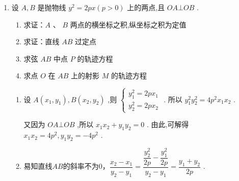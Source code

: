 \begin{enumerate}
\begin{jieda}
        设点 $P\left( {{x}_{1},{y}_{1}}\right) ,Q\left( {{x}_{2},{y}_{2}}\right)$，则 $\left\{  \begin{array}{l} {y}_{1}^{2} = 2{x}_{1}, \\  {y}_{2}^{2} = 2{x}_{2}, \end{array}\right.$
        
        两式相减可得$\left( {{y}_{1} - {y}_{2}}\right) \left( {{y}_{1} + {y}_{2}}\right)  = 2\left( {{x}_{1} - {x}_{2}}\right)$，故${k}_{PQ} = \dfrac{2}{{y}_{1} + {y}_{2}}$
        
        因为$P,Q$ 关于直线 $l$ 对称，所以${k}_{PQ} =  - 1$ ,即 ${y}_{1} + {y}_{2} =  - 2$，因此${PQ}$ 中点的纵坐标为 $\dfrac{{y}_{1} + {y}_{2}}{2} =  - 1$
        
        因为${PQ}$ 的中点在直线 $l$ 上，代入直线方程可得${PQ}$ 中点的横坐标为 $\dfrac{{x}_{1} + {x}_{2}}{2} = \left( {-1}\right)  + 2 = 1$ .
        
        故线段 ${PQ}$ 的中点坐标为(1, - 1).
    \end{jieda}
    \item 设 $A,B$ 是抛物线 ${y}^{2} = {2px}\left( {p > 0}\right)$ 上的两点,且 ${OA} \bot  {OB}$ .
    \begin{enumerate}
        \item 求证：$A$ 、 $B$ 两点的横坐标之积,纵坐标之积为定值
        \item 求证：直线 ${AB}$ 过定点
        \item 求弦 ${AB}$ 中点 $P$ 的轨迹方程
        \item 求点 $O$ 在 ${AB}$ 上的射影 $M$ 的轨迹方程
    \end{enumerate}
    \begin{jieda}
        \begin{enumerate}
            \item 设 $A\left( {{x}_{1},{y}_{1}}\right) ,B\left( {{x}_{2},{y}_{2}}\right)$ ,则 $\left\{\begin{array}{l}
                 {y}_{1}^{2} = {2p}{x}_{1}  \\
                 {y}_{2}^{2} = {2p}{x}_{2}
            \end{array}\right.$ . 所以 ${y}_{1}^{2}{y}_{2}^{2} = 4{p}^{2}{x}_{1}{x}_{2}$ .
            
            又因为 ${OA} \bot  {OB}$ ,所以 ${x}_{1}{x}_{2} + {y}_{1}{y}_{2} = 0$ . 由此,可解得 ${x}_{1}{x}_{2} = 4{p}^{2},{y}_{1}{y}_{2} =  - 4{p}^{2}$ .
            \item 易知直线$AB$的斜率不为0，$\dfrac{{x}_{2} - {x}_{1}}{{y}_{2} - {y}_{1}} = \dfrac{\dfrac{{y}_{2}^{2}}{2p} - \dfrac{{y}_{1}^{2}}{2p}}{{y}_{2} - {y}_{1}} = \dfrac{{y}_{1} + {y}_{2}}{2p}$ .
            

\end{enumerate}
\end{jieda}
\end{enumerate}
